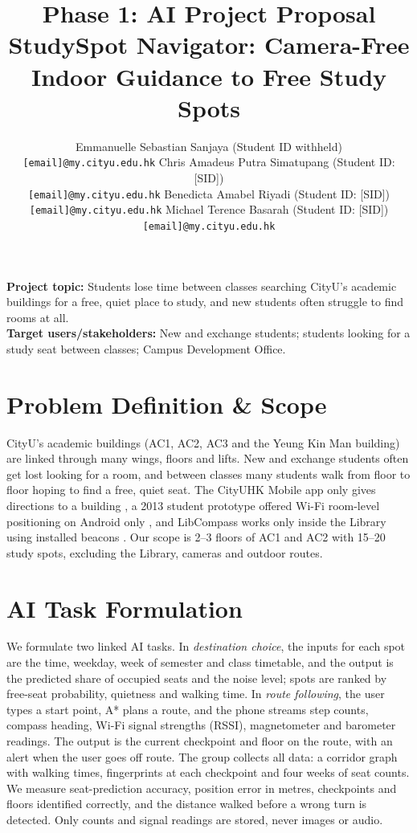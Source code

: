 \documentclass{article}
\title{Phase 1: AI Project Proposal\\
\large StudySpot Navigator: Camera-Free Indoor Guidance to Free Study Spots}
\author{
  Emmanuelle Sebastian Sanjaya (Student ID withheld)\\
  \texttt{[email]@my.cityu.edu.hk}
  \And
  Chris Amadeus Putra Simatupang (Student ID: [SID])\\
  \texttt{[email]@my.cityu.edu.hk}
  \AND
  Benedicta Amabel Riyadi (Student ID: [SID])\\
  \texttt{[email]@my.cityu.edu.hk}
  \And
  Michael Terence Basarah (Student ID: [SID])\\
  \texttt{[email]@my.cityu.edu.hk}
}
\begin{document}
\maketitle

\noindent\textbf{Project topic:} Students lose time between classes searching CityU's academic buildings for a free, quiet place to study, and new students often struggle to find rooms at all.\\
\textbf{Target users/stakeholders:} New and exchange students; students looking for a study seat between classes; Campus Development Office.


\section{Problem Definition \& Scope}
CityU's academic buildings (AC1, AC2, AC3 and the Yeung Kin Man building) are linked through many wings, floors and lifts. New and exchange students often get lost looking for a room, and between classes many students walk from floor to floor hoping to find a free, quiet seat. The CityUHK Mobile app only gives directions to a building \cite{cityumobile}, a 2013 student prototype offered Wi-Fi room-level positioning on Android only \cite{cityu2013}, and LibCompass works only inside the Library using installed beacons \cite{libcompass}. Our scope is 2--3 floors of AC1 and AC2 with 15--20 study spots, excluding the Library, cameras and outdoor routes.

\section{AI Task Formulation}
We formulate two linked AI tasks. In \emph{destination choice}, the inputs for each spot are the time, weekday, week of semester and class timetable, and the output is the predicted share of occupied seats and the noise level; spots are ranked by free-seat probability, quietness and walking time. In \emph{route following}, the user types a start point, A* plans a route, and the phone streams step counts, compass heading, Wi-Fi signal strengths (RSSI), magnetometer and barometer readings. The output is the current checkpoint and floor on the route, with an alert when the user goes off route. The group collects all data: a corridor graph with walking times, fingerprints at each checkpoint and four weeks of seat counts. We measure seat-prediction accuracy, position error in metres, checkpoints and floors identified correctly, and the distance walked before a wrong turn is detected. Only counts and signal readings are stored, never images or audio.
\end{document}
